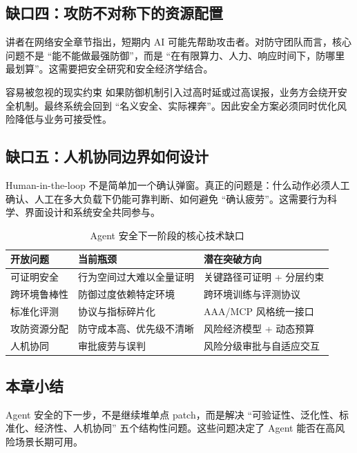 \subsection{缺口四：攻防不对称下的资源配置}
讲者在网络安全章节指出，短期内 AI 可能先帮助攻击者。对防守团队而言，核心问题不是 ``能不能做最强防御''，而是 ``在有限算力、人力、响应时间下，防哪里最划算''。这需要把安全研究和安全经济学结合。

\begin{warningbox}{容易被忽视的现实约束}
如果防御机制引入过高时延或过高误报，业务方会绕开安全机制。最终系统会回到 ``名义安全、实际裸奔''。因此安全方案必须同时优化风险降低与业务可接受性。
\end{warningbox}

\subsection{缺口五：人机协同边界如何设计}
Human-in-the-loop 不是简单加一个确认弹窗。真正的问题是：什么动作必须人工确认、人工在多大负载下仍能可靠判断、如何避免 ``确认疲劳''。这需要行为科学、界面设计和系统安全共同参与。

\begin{table}[H]
\centering
\begin{tabular}{p{2.9cm}p{3.6cm}p{3.9cm}}
\toprule
\textbf{开放问题} & \textbf{当前瓶颈} & \textbf{潜在突破方向} \\
\midrule
可证明安全 & 行为空间过大难以全量证明 & 关键路径可证明 + 分层约束 \\
跨环境鲁棒性 & 防御过度依赖特定环境 & 跨环境训练与评测协议 \\
标准化评测 & 协议与指标碎片化 & AAA/MCP 风格统一接口 \\
攻防资源分配 & 防守成本高、优先级不清晰 & 风险经济模型 + 动态预算 \\
人机协同 & 审批疲劳与误判 & 风险分级审批与自适应交互 \\
\bottomrule
\end{tabular}
\caption{Agent 安全下一阶段的核心技术缺口}
\end{table}

\subsection{本章小结}
Agent 安全的下一步，不是继续堆单点 patch，而是解决 ``可验证性、泛化性、标准化、经济性、人机协同'' 五个结构性问题。这些问题决定了 Agent 能否在高风险场景长期可用。


